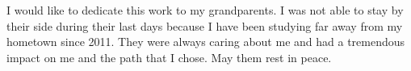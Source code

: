 I would like to dedicate this work to my grandparents. I was not able to stay by their side during their last days because I have been studying far away from my hometown since 2011. They were always caring about me and had a tremendous impact on me and the path that I chose. May them rest in peace.
